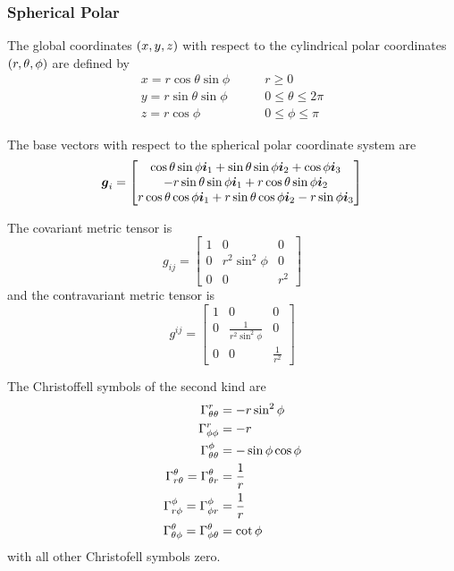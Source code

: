 \subsubsection{Spherical Polar}

The global coordinates $\left( x,y,z \right)$ with respect to the cylindrical polar
coordinates $\left( r,\theta,\phi \right)$ are defined by
\begin{equation}
  \begin{aligned}
    x = r\cos\theta\sin\phi & \qquad r \ge 0 \\
    y = r\sin\theta\sin\phi & \qquad 0 \le \theta \le 2\pi \\
    z = r\cos\phi & \qquad 0 \le \phi \le \pi
  \end{aligned}
\end{equation}

The base vectors with respect to the spherical polar coordinate system are
\begin{equation}
  \vect{g}_{i}=\begin{bmatrix} 
    \cos\theta\sin\phi\vect{i}_{1}+\sin\theta\sin\phi\vect{i}_{2}+\cos\phi\vect{i}_{3} \\ 
    -r\sin\theta\sin\phi\vect{i}_{1}+r\cos\theta\sin\phi\vect{i}_{2} \\
    r\cos\theta\cos\phi\vect{i}_{1}+r\sin\theta\cos\phi\vect{i}_{2}-r\sin\phi\vect{i}_{3}
  \end{bmatrix}
\end{equation}

The covariant metric tensor is
\begin{equation}
  g_{ij}=\begin{bmatrix}
    1 & 0 & 0 \\
    0 & r^{2}\sin^{2}\phi & 0 \\
    0 & 0 & r^{2} 
  \end{bmatrix}
\end{equation}
and the contravariant metric tensor is
\begin{equation}
  g^{ij}=\begin{bmatrix}
    1 & 0 & 0 \\
    0 &  \frac{1}{r^{2}\sin^{2}\phi} & 0 \\
    0 & 0 & \frac{1}{r^{2}} 
  \end{bmatrix}
\end{equation}

The Christoffell symbols of the second kind are
\begin{align}
   \Gamma^{r}_{\theta\theta} &=-r\sin^{2}\phi \\
   \Gamma^{r}_{\phi\phi} &=-r \\
   \Gamma^{\phi}_{\theta\theta} &=-\sin\phi\cos\phi \\
   \Gamma^{\theta}_{r\theta} = \Gamma^{\theta}_{\theta r} &=\frac{1}{r} \\
   \Gamma^{\phi}_{r\phi} = \Gamma^{\phi}_{\phi r} &=\frac{1}{r} \\
   \Gamma^{\theta}_{\theta\phi} = \Gamma^{\theta}_{\phi\theta} &=\cot\phi
\end{align}
with all other Christofell symbols zero.

